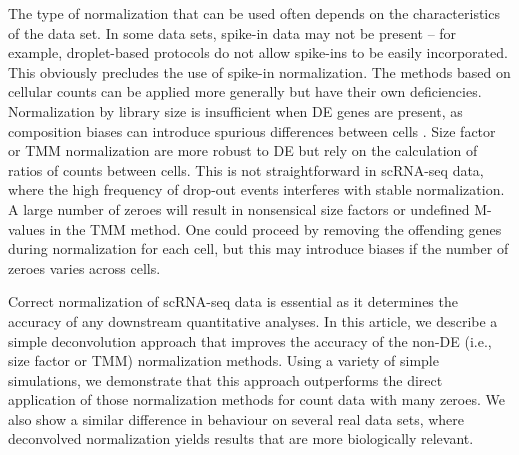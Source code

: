\documentclass{article}
\begin{document}
The type of normalization that can be used often depends on the characteristics of the data set.
In some data sets, spike-in data may not be present -- for example, droplet-based protocols \cite{klein2015droplet,macosko2015highly} do not allow spike-ins to be easily incorporated.
This obviously precludes the use of spike-in normalization.
The methods based on cellular counts can be applied more generally but have their own deficiencies.
Normalization by library size is insufficient when DE genes are present, as composition biases can introduce spurious differences between cells \cite{robinson2010scaling}.
Size factor or TMM normalization are more robust to DE but rely on the calculation of ratios of counts between cells.
This is not straightforward in scRNA-seq data, where the high frequency of drop-out events interferes with stable normalization.
A large number of zeroes will result in nonsensical size factors or undefined M-values in the TMM method.
One could proceed by removing the offending genes during normalization for each cell, but this may introduce biases if the number of zeroes varies across cells.

Correct normalization of scRNA-seq data is essential as it determines the accuracy of any downstream quantitative analyses.
In this article, we describe a simple deconvolution approach that improves the accuracy of the non-DE (i.e., size factor or TMM) normalization methods.
Using a variety of simple simulations, we demonstrate that this approach outperforms the direct application of those normalization methods for count data with many zeroes.
We also show a similar difference in behaviour on several real data sets, where deconvolved normalization yields results that are more biologically relevant.



\end{document}
